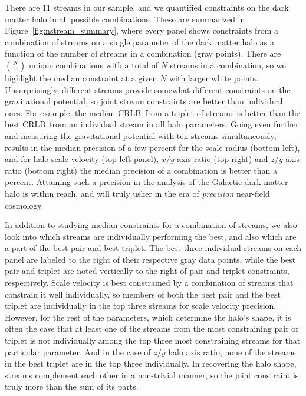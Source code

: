 \documentclass[modern]{aastex61}
\newcommand{\acronym}[1]{{\small{#1}}}
\newcommand{\CRLB}{\acronym{CRLB}}
\begin{document}
There are 11 streams in our sample, and we quantified constraints on the dark matter halo in all possible combinations.
These are summarized in Figure~\ref{fig:nstream_summary}, where every panel shows constraints from a combination of streams on a single parameter of the dark matter halo as a function of the number of streams in a combination (gray points).
There are $\binom{N}{11}$ unique combinations with a total of $N$ streams in a combination, so we highlight the median constraint at a given $N$ with larger white points.
Unsurprisingly, different streams provide somewhat different constraints on the gravitational potential, so joint stream constraints are better than individual ones.
For example, the median \CRLB\ from a triplet of streams is better than the best \CRLB\ from an individual stream in all halo parameters.
Going even further and measuring the gravitational potential with ten streams simultaneously, results in the median precision of a few percent for the scale radius (bottom left), and for halo scale velocity (top left panel), $x/y$ axis ratio (top right) and $z/y$ axis ratio (bottom right) the median precision of a combination is better than a percent.
Attaining such a precision in the analysis of the Galactic dark matter halo is within reach, and will truly usher in the era of \emph{precision} near-field cosmology.

In addition to studying median constraints for a combination of streams, we also look into which streams are individually performing the best, and also which are a part of the best pair and best triplet.
The best three individual streams on each panel are labeled to the right of their respective gray data points, while the best pair and triplet are noted vertically to the right of pair and triplet constraints, respectively.
Scale velocity is best constrained by a combination of streams that constrain it well individually, so members of both the best pair and the best triplet are individually in the top three streams for scale velocity precision.
However, for the rest of the parameters, which determine the halo's shape, it is often the case that at least one of the streams from the most constraining pair or triplet is not individually among the top three most constraining streams for that particular parameter.
And in the case of $z/y$ halo axis ratio, none of the streams in the best triplet are in the top three individually.
In recovering the halo shape, streams complement each other in a non-trivial manner, so the joint constraint is truly more than the sum of its parts.
\end{document}
